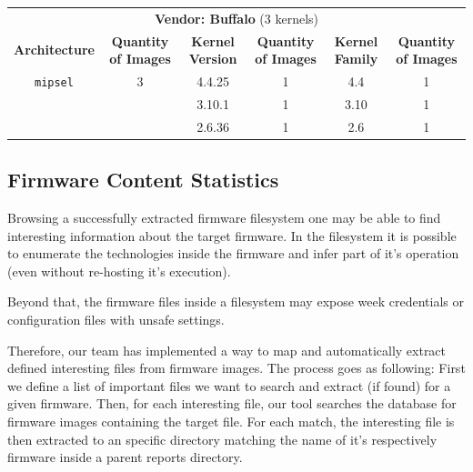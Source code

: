 \begin{table}[h]
{\begin{tabular}{cccccc}
\multicolumn{6}{c}{\textbf{Vendor: Buffalo} (3 kernels)}                                                                    \\
\textbf{Architecture} & \multicolumn{1}{c|}{\textbf{Quantity of Images}} & \textbf{Kernel Version} & \multicolumn{1}{c|}{\textbf{Quantity of Images}} & \textbf{Kernel Family} & \textbf{Quantity of Images} \\ \hline
{\tt mipsel}            & \multicolumn{1}{c|}{3}                & 4.4.25                 & \multicolumn{1}{c|}{1}                            & 4.4                     & 1                          \\
                        & \multicolumn{1}{c|}{}                 & 3.10.1                  & \multicolumn{1}{c|}{1}                           & 3.10                    & 1                          \\
                        & \multicolumn{1}{c|}{}                 & 2.6.36                  & \multicolumn{1}{c|}{1}                           & 2.6                     & 1                          \\ \hline
\end{tabular}}
\label{tab:kernel-stats-by-vendor}
\end{table}

\subsection{Firmware Content Statistics}
\label{sec:firmware-content-statistics}

Browsing a successfully extracted firmware filesystem one may be able to find interesting information about the target firmware. In the filesystem it is possible to enumerate the technologies inside the firmware and infer part of it's operation (even without re-hosting it's execution).

Beyond that, the firmware files inside a filesystem may expose week credentials or configuration files with unsafe settings.

Therefore, our team has implemented a way to map and automatically extract defined interesting files from firmware images. The process goes as following: First we define a list of important files we want to search and extract (if found) for a given firmware. Then, for each interesting file, our tool searches the database for firmware images containing the target file. For each match, the interesting file is then extracted to an specific directory matching the name of it's respectively firmware inside a parent reports directory.

